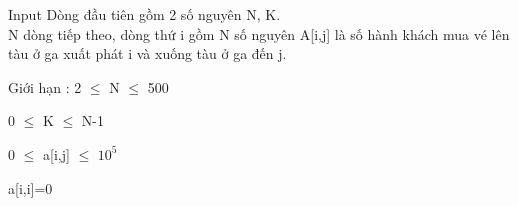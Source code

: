 Input
Dòng đầu tiên gồm 2 số nguyên N, K.   
\\   N dòng tiếp theo, dòng thứ i gồm N số nguyên A[i,j] là số hành khách mua vé lên tàu ở ga xuất phát i và xuống tàu ở ga đến j.  

    Giới hạn :      2  $\le$  N  $\le$  500  

   0  $\le$  K  $\le$  N-1  

   0  $\le$  a[i,j]  $\le$  $10^{5}$

   a[i,i]=0